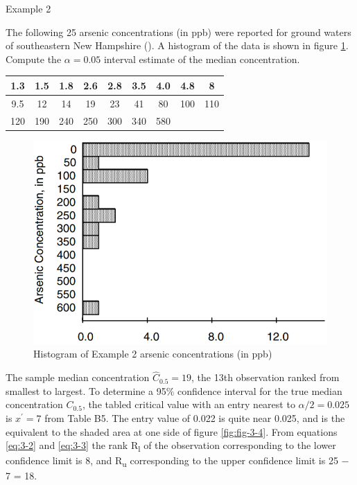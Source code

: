 \documentclass[]{book}
\begin{document}
Example 2

The following 25 arsenic concentrations (in ppb) were reported for ground waters of southeastern New Hampshire (\citet{boudette_high_1985}). A histogram of the data is shown in figure \ref{fig:fig-3-5}. Compute the \(\alpha = 0.05\) interval estimate of the median concentration.

\begin{longtable}[]{@{}ccccccccc@{}}
\toprule
1.3 & 1.5 & 1.8 & 2.6 & 2.8 & 3.5 & 4.0 & 4.8 & 8\tabularnewline
\midrule
\endhead
9.5 & 12 & 14 & 19 & 23 & 41 & 80 & 100 & 110\tabularnewline
120 & 190 & 240 & 250 & 300 & 340 & 580 & &\tabularnewline
\bottomrule
\end{longtable}

\begin{figure}

{\centering \includegraphics[width=11.07in]{figures/3_5} 

}

\caption{Histogram of Example 2 arsenic concentrations (in ppb)}\label{fig:fig-3-5}
\end{figure}

The sample median concentration \(\hat{C}_{0.5} = 19\), the 13th observation ranked from smallest to largest. To determine a 95\% confidence interval for the true median concentration \(C_{0.5}\), the tabled critical value with an entry nearest to \(\alpha / 2 = 0.025\) is \(x^{\prime} = 7\) from Table B5. The entry value of 0.022 is quite near 0.025, and is the equivalent to the shaded area at one side of figure \ref{fig:fig-3-4}. From equations \eqref{eq:3-2} and \eqref{eq:3-3} the rank R\textsubscript{l} of the observation corresponding to the lower confidence limit is 8, and R\textsubscript{u} corresponding to the upper confidence limit is 25 − 7 = 18.
\end{document}

